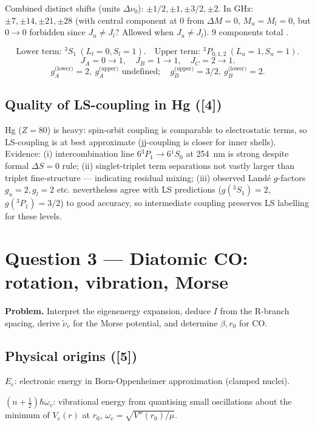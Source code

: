 \documentclass[11pt]{article}
\begin{document}
Combined distinct shifts (units $\Delta\nu_0$): $\pm 1/2,\pm 1,\pm 3/2,\pm 2$. In
GHz: $\pm 7,\pm 14,\pm 21,\pm 28$ \checkmark (with central component at $0$ from
$\Delta M=0$, $M_u=M_l=0$, but $0\to 0$ forbidden since $J_u\neq J_l$? Allowed
when $J_u\neq J_l$). 9 components total \checkmark.

\[
\boxed{\;\text{Lower term: } {}^3S_1\ (L_l=0,S_l=1).\quad\text{Upper term: } {}^3P_{0,1,2}\ (L_u=1,S_u=1).\;}
\]
\[
J_A=0\to 1,\quad J_B=1\to 1,\quad J_C=2\to 1.
\]
\[
g_A^{\text{(lower)}} = 2,\ g_A^{\text{(upper)}}\text{ undefined};\quad g_B^{\text{(upper)}} = 3/2,\ g_B^{\text{(lower)}} = 2.
\]

\subsection*{Quality of LS-coupling in Hg ([4])}

Hg ($Z=80$) is heavy: spin-orbit coupling is comparable to electrostatic terms,
so LS-coupling is at best approximate (jj-coupling is closer for inner shells).
Evidence: (i) intercombination line $6{}^3P_1\to 6{}^1S_0$ at \SI{254}{nm} is
strong despite formal $\Delta S=0$ rule; (ii) singlet-triplet term separations
not vastly larger than triplet fine-structure --- indicating residual mixing;
(iii) observed Land\'e $g$-factors $g_u=2, g_l=2$ etc. nevertheless agree with
LS predictions ($g({}^3S_1)=2$, $g({}^3P_1)=3/2$) to good accuracy, so
intermediate coupling preserves LS labelling for these levels.

\section*{Question 3 --- Diatomic CO: rotation, vibration, Morse}

\textbf{Problem.} Interpret the eigenenergy expansion, deduce $I$ from the R-branch
spacing, derive $\tilde\nu_v$ for the Morse potential, and determine $\beta,r_0$ for CO.

\subsection*{Physical origins ([5])}

$E_e$: electronic energy in Born-Oppenheimer approximation (clamped nuclei).

$(n+\tfrac12)\hbar\omega_v$: vibrational energy from quantising small oscillations
about the minimum of $V_e(r)$ at $r_0$, $\omega_v = \sqrt{V''(r_0)/\mu}$.
\end{document}
